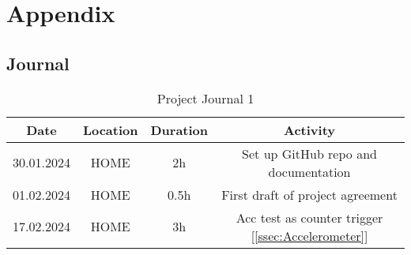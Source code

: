 \chapter{Appendix}
\label{cha:Appendix}

\section{Journal}
\label{sec:Journal}

\begin{table}[H]
    \centering
    
\begin{tabular}{||c | c | c || c||} 
 \hline
 Date &  Location & Duration & Activity \\ [0.5ex] 
 \hline\hline
  30.01.2024 & HOME & 2h & Set up GitHub repo and documentation \\ 
 \hline
   01.02.2024 & HOME & 0.5h & First draft of project agreement \\ 
 \hline
    17.02.2024 & HOME & 3h & Acc test as counter trigger [\ref{ssec:Accelerometer}] \\ 
 \hline


\end{tabular}
    \caption{Project Journal 1}
    \label{tab:Project Journal 1}
\end{table}

\newpage